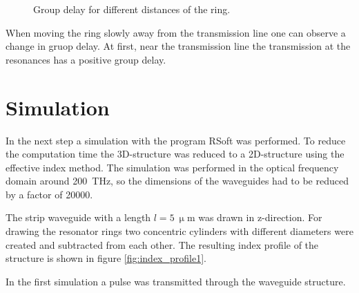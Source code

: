 \begin{figure}
\caption{Group delay for different distances of the ring.}%
\label{fig:1_TE}%
\end{figure}
When moving the ring slowly away from the transmission line one can observe a change in gruop delay. At first, near the transmission line the transmission at the resonances has a positive group delay.

\chapter{Simulation}
In the next step a simulation with the program RSoft was performed. To reduce the computation time the 3D-structure was reduced to a 2D-structure using the effective index method. The simulation was performed in the optical frequency domain around 200~THz, so the dimensions of the waveguides had to be reduced by a factor of 20000. 

The strip waveguide with a length $l=5~\upmu$m was drawn in z-direction. For drawing the resonator rings two concentric cylinders with different diameters were created and subtracted from each other. The resulting index profile of the structure is shown in figure \ref{fig:index_profile1}.

In the first simulation a pulse was transmitted through the waveguide structure.



